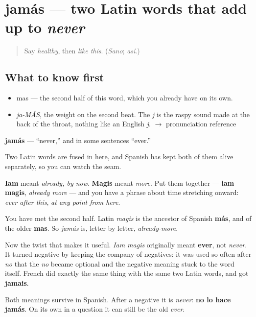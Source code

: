 \section[jamás]{jamás — two Latin words that add up to \emph{never}}

\label{lesson:ES-C328-jamas}



\begin{quote}
Say \emph{healthy}, then \emph{like this}. (\emph{Sano}; \emph{así}.)
\end{quote}

\subsection*{What to know first}
\begin{itemize}
\raggedright
  \item mas — the second half of this word, which you already have on its own.
\end{itemize}

\begin{sounds}
\begin{itemize}
\raggedright
  \item \emph{ja-MÁS}, the weight on the second beat. The \emph{j} is the raspy sound made at the back of the throat, nothing like an English \emph{j}. $\to$ pronunciation reference
\end{itemize}
\end{sounds}

\begin{cousinweb}
\textbf{jamás} — \textquotedblleft{}never,\textquotedblright{} and in some sentences \textquotedblleft{}ever.\textquotedblright{}

Two Latin words are fused in here, and Spanish has kept both of them alive separately, so you can watch the seam.

\textbf{Iam} meant \emph{already, by now}. \textbf{Magis} meant \emph{more}. Put them together — \textbf{iam magis}, \emph{already more} — and you have a phrase about time stretching onward: \emph{ever after this}, \emph{at any point from here}.

You have met the second half. Latin \emph{magis} is the ancestor of Spanish \textbf{más}, and of the older \textbf{mas}. So \emph{jamás} is, letter by letter, \emph{already-more}.

Now the twist that makes it useful. \emph{Iam magis} originally meant \textbf{ever}, not \emph{never}. It turned negative by keeping the company of negatives: it was used so often after \emph{no} that the \emph{no} became optional and the negative meaning stuck to the word itself. French did exactly the same thing with the same two Latin words, and got \textbf{jamais}.

Both meanings survive in Spanish. After a negative it is \emph{never}: \textbf{no lo hace jamás}. On its own in a question it can still be the old \emph{ever}.
\end{cousinweb}

